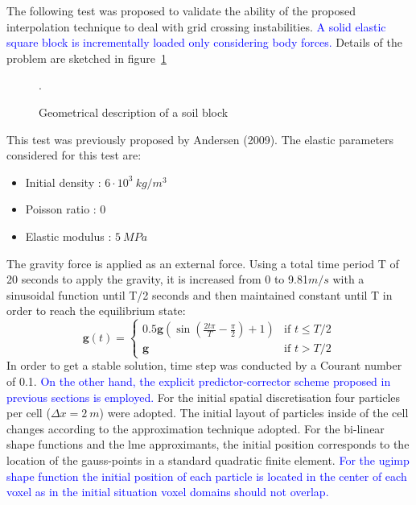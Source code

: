 \documentclass[preprint,12pt,a4paper]{elsarticle}
\begin{document}
The following test was proposed to validate the ability of the proposed
interpolation technique to deal with grid crossing instabilities. \textcolor{blue}{A solid elastic square block is incrementally loaded only considering body forces.} Details of the problem are sketched in figure~\ref{fig:block}
\begin{figure}
  \centering
  \resizebox{0.7\hsize}{!}{
    }
  \caption{Geometrical description of a soil block }.
  \label{fig:block}
\end{figure}
This test was previously proposed by Andersen (2009)\cite{thesis_Andersen_2009}. The
elastic parameters considered for this test are: 
\begin{itemize} 
\item  Initial density : $6\cdot 10^3\ kg/m^3$
\item  Poisson ratio : $0$
\item  Elastic modulus : $5\ MPa$
\end{itemize}
The gravity force is applied as an external force. Using a total time period T of 20 seconds to apply the gravity, it is increased from 0 to 9.81$m/s$
with a sinusoidal function until T/2 seconds and then maintained constant until T
in order to reach the equilibrium state:
\begin{equation}
  \label{eq:gravity-load-block}
 \mathbf{g}(t) = \left\{
    \begin{array}{ll}
      0.5 \mathbf{g} (\sin(\frac{2t \pi}{T} - \frac{\pi}{2})+1)  & \mbox{if } t \leq T/2 \\
      \mathbf{g} & \mbox{if } t > T/2
    \end{array}
  \right.
\end{equation}
In order to get a stable solution, time step was conducted by a
Courant number of 0.1. \textcolor{blue}{On the other hand, the explicit
predictor-corrector scheme proposed in previous sections is employed.} For the initial spatial discretisation four particles per cell
($\Delta x = 2\ m$) were adopted. The initial layout of particles inside of the
cell changes according to the approximation technique adopted. For the
bi-linear shape functions and the \acrshort{lme} approximants, the initial
position corresponds to the location of the gauss-points in a standard
quadratic finite element. \textcolor{blue}{For the \acrshort{ugimp} shape function the initial
position of each particle is located in the center of each voxel as in the initial situation voxel domains should not overlap.}
\end{document}
